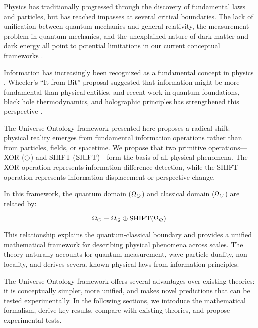 Physics has traditionally progressed through the discovery of fundamental laws and particles, but has reached impasses at several critical boundaries. The lack of unification between quantum mechanics and general relativity, the measurement problem in quantum mechanics, and the unexplained nature of dark matter and dark energy all point to potential limitations in our current conceptual frameworks \cite{Wheeler1990}.

Information has increasingly been recognized as a fundamental concept in physics \cite{vonBaeyer2003, Vedral2010}. Wheeler's ``It from Bit'' proposal suggested that information might be more fundamental than physical entities, and recent work in quantum foundations, black hole thermodynamics, and holographic principles has strengthened this perspective \cite{Rovelli2015}.

The Universe Ontology framework presented here proposes a radical shift: physical reality emerges from fundamental information operations rather than from particles, fields, or spacetime. We propose that two primitive operations—XOR ($\oplus$) and SHIFT ($\text{SHIFT}$)—form the basis of all physical phenomena. The XOR operation represents information difference detection, while the SHIFT operation represents information displacement or perspective change.

In this framework, the quantum domain ($\Omega_Q$) and classical domain ($\Omega_C$) are related by:

\begin{equation}
\Omega_C = \Omega_Q \oplus \text{SHIFT}(\Omega_Q)
\end{equation}

This relationship explains the quantum-classical boundary and provides a unified mathematical framework for describing physical phenomena across scales. The theory naturally accounts for quantum measurement, wave-particle duality, non-locality, and derives several known physical laws from information principles.

The Universe Ontology framework offers several advantages over existing theories: it is conceptually simpler, more unified, and makes novel predictions that can be tested experimentally. In the following sections, we introduce the mathematical formalism, derive key results, compare with existing theories, and propose experimental tests. 